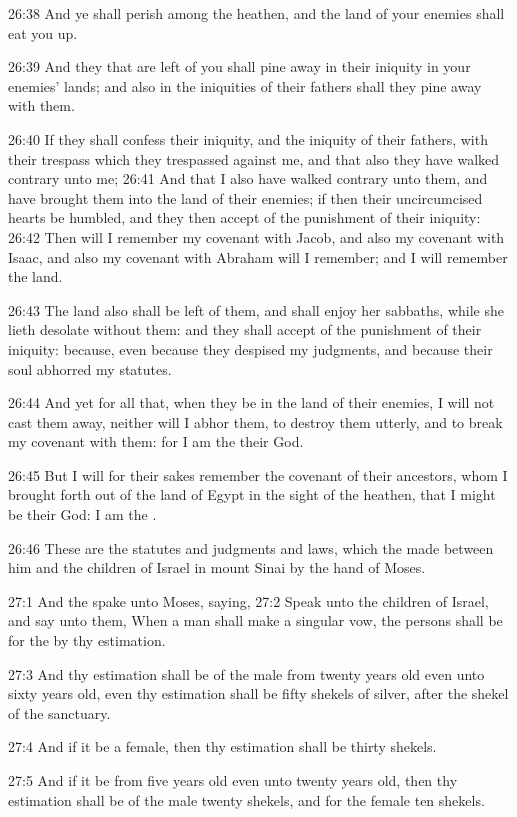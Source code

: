 26:38 And ye shall perish among the heathen, and the land of your enemies shall eat you up.

26:39 And they that are left of you shall pine away in their iniquity in your enemies' lands; and also in the iniquities of their fathers shall they pine away with them.

26:40 If they shall confess their iniquity, and the iniquity of their fathers, with their trespass which they trespassed against me, and that also they have walked contrary unto me; 26:41 And that I also have walked contrary unto them, and have brought them into the land of their enemies; if then their uncircumcised hearts be humbled, and they then accept of the punishment of their iniquity: 26:42 Then will I remember my covenant with Jacob, and also my covenant with Isaac, and also my covenant with Abraham will I remember; and I will remember the land.

26:43 The land also shall be left of them, and shall enjoy her sabbaths, while she lieth desolate without them: and they shall accept of the punishment of their iniquity: because, even because they despised my judgments, and because their soul abhorred my statutes.

26:44 And yet for all that, when they be in the land of their enemies, I will not cast them away, neither will I abhor them, to destroy them utterly, and to break my covenant with them: for I am the \LORD their God.

26:45 But I will for their sakes remember the covenant of their ancestors, whom I brought forth out of the land of Egypt in the sight of the heathen, that I might be their God: I am the \LORD.

26:46 These are the statutes and judgments and laws, which the \LORD made between him and the children of Israel in mount Sinai by the hand of Moses.

27:1 And the \LORD spake unto Moses, saying, 27:2 Speak unto the children of Israel, and say unto them, When a man shall make a singular vow, the persons shall be for the \LORD by thy estimation.

27:3 And thy estimation shall be of the male from twenty years old even unto sixty years old, even thy estimation shall be fifty shekels of silver, after the shekel of the sanctuary.

27:4 And if it be a female, then thy estimation shall be thirty shekels.

27:5 And if it be from five years old even unto twenty years old, then thy estimation shall be of the male twenty shekels, and for the female ten shekels.

